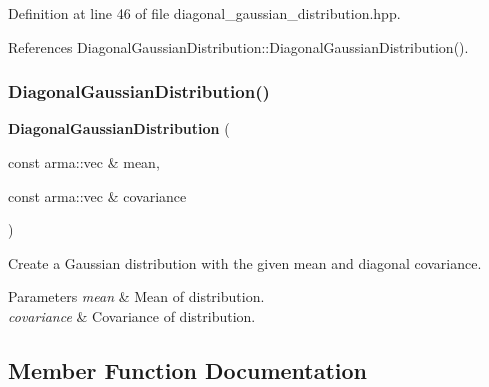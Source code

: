 Definition at line 46 of file diagonal\+\_\+gaussian\+\_\+distribution.\+hpp.



References Diagonal\+Gaussian\+Distribution\+::\+Diagonal\+Gaussian\+Distribution().

\mbox{\label{classmlpack_1_1distribution_1_1DiagonalGaussianDistribution_a99d581f05bb370789481f5c33747d616}} 
\subsubsection{Diagonal\+Gaussian\+Distribution()\hspace{0.1cm}{\footnotesize\ttfamily [3/3]}}
{\footnotesize\ttfamily \textbf{ Diagonal\+Gaussian\+Distribution} (\begin{DoxyParamCaption}\item[{const arma\+::vec \&}]{mean,  }\item[{const arma\+::vec \&}]{covariance }\end{DoxyParamCaption})}



Create a Gaussian distribution with the given mean and diagonal covariance. 


\begin{DoxyParams}{Parameters}
{\em mean} & Mean of distribution. \\
\hline
{\em covariance} & Covariance of distribution. \\
\hline
\end{DoxyParams}


\subsection{Member Function Documentation}
\mbox{\label{classmlpack_1_1distribution_1_1DiagonalGaussianDistribution_ad6dd9f58ac49805f6c1c4d473880e907}} 
